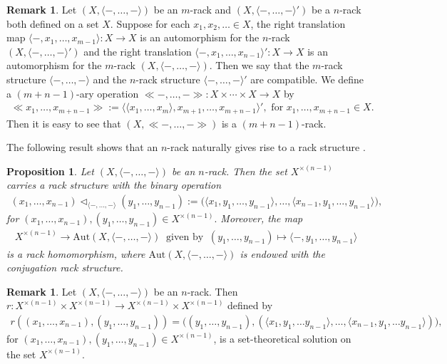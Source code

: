 \documentclass[a4paper,reqno,10pt]{amsart}
\theoremstyle{plain}
\newtheorem{prop}[thm]{Proposition}
\theoremstyle{definition}
\newtheorem{remark}[thm]{Remark}
\theoremstyle{remark}
\begin{document}
\begin{remark} 
    Let $(X, \langle -, \ldots, - \rangle)$ be an $m$-rack and $(X, \langle - , \ldots, - \rangle')$ be a $n$-rack both defined on a set $X$. Suppose for each $x_1, x_2, \ldots \in X$, the right translation map $\langle - , x_1, \ldots, x_{m-1} \rangle : X \rightarrow X$ is an automorphism for the $n$-rack $(X, \langle -, \ldots, - \rangle')$ and the right translation $\langle - , x_1, \ldots, x_{n-1} \rangle' : X \rightarrow X$ is an automorphism for the $m$-rack $(X, \langle -, \ldots, - \rangle)$. Then we say that the $m$-rack structure $\langle -, \ldots, - \rangle$ and the $n$-rack structure $\langle - ,\ldots , - \rangle'$ are compatible. We define a $(m+n-1)$-ary operation $\ll -, \ldots, - \gg : X \times \cdots \times X \rightarrow X$ by
    \begin{align*}
        \ll x_1, \ldots, x_{m+n-1} \gg := \langle \langle x_1, \ldots, x_m \rangle , x_{m+1}, \ldots, x_{m+n-1} \rangle', \text{ for } x_1, \ldots, x_{m+n-1} \in X.
    \end{align*}
    Then it is easy to see that $(X, \ll -, \ldots, - \gg )$ is a $(m+n-1)$-rack.
\end{remark}

The following result shows that an $n$-rack naturally gives rise to a rack structure \cite{biyog}.

\begin{prop}\label{prop-nrack-rack}
    Let $(X, \langle - , \ldots, - \rangle )$ be an $n$-rack. Then the set $X^{\times (n-1)}$ carries a rack structure with the binary operation
    \begin{align*}
        (x_1, \ldots, x_{n-1}) \triangleleft_{\langle - , \ldots, - \rangle} (y_1, \ldots, y_{n-1}) := \big( \langle x_1, y_1, \ldots, y_{n-1} \rangle, \ldots,  \langle x_{n-1}, y_1, \ldots, y_{n-1} \rangle   \big),
    \end{align*}
    for $(x_1, \ldots, x_{n-1}), (y_1, \ldots, y_{n-1}) \in X^{\times (n-1)}.$ Moreover, the map 
    \begin{align*}
        X^{\times (n-1)} \rightarrow \mathrm{Aut} (X, \langle -, \ldots, - \rangle) ~ \text{ given by } ~  (y_1, \ldots, y_{n-1}) \mapsto \langle -, y_1, \ldots, y_{n-1} \rangle
    \end{align*}
is a rack homomorphism, where $\mathrm{Aut} (X, \langle -, \ldots, - \rangle)$ is endowed with the conjugation rack structure.
\end{prop}

\begin{remark}
Let $(X, \langle - , \ldots , - \rangle)$ be an $n$-rack. Then $r: X^{\times (n-1)} \times X^{\times (n-1)} \rightarrow  X^{\times (n-1)} \times X^{\times (n-1)}$ defined by
\begin{align*}
r (( x_1, \ldots, x_{n-1}), (y_1, \ldots, y_{n-1})) = \big(   (y_1, \ldots, y_{n-1}), ( \langle x_1, y_1, \ldots y_{n-1} \rangle, \ldots , \langle x_{n-1}, y_1, \ldots y_{n-1} \rangle)  \big),
    \end{align*}
for $(x_1, \ldots, x_{n-1}), (y_1, \ldots, y_{n-1}) \in X^{\times (n-1)}$, is a set-theoretical solution on the set $X^{\times (n-1)}$.
\end{remark}
\end{document}

